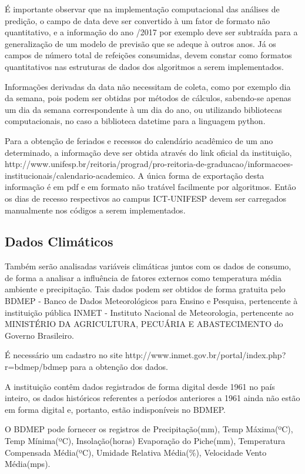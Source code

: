 \documentclass[	12pt, Times, openright, twoside, a4paper, english, brazil]{abntex2}
\begin{document}
É importante observar que na implementação computacional das análises de predição, o campo de data deve ser convertido à um fator de formato não quantitativo, e a informação do ano /2017 por exemplo deve ser subtraída para a generalização de um modelo de previsão que se adeque à outros anos. Já os campos de número total de refeições consumidas, devem constar como formatos quantitativos nas estruturas de dados dos algoritmos a serem implementados.

Informações derivadas da data não necessitam de coleta, como por exemplo dia da semana, pois podem ser obtidas por métodos de cálculos, sabendo-se apenas um dia da semana correspondente à um dia do ano, ou utilizando bibliotecas computacionais, no caso a biblioteca datetime para a linguagem python.

Para a obtenção de feriados e recessos do calendário acadêmico de um ano determinado, a informação deve ser obtida através do link oficial da instituição, http://www.unifesp.br/reitoria/prograd/pro-reitoria-de-graduacao/informacoes-institucionais/calendario-academico. A única forma de exportação desta informação é em pdf e em formato não tratável facilmente por algoritmos. Então os dias de recesso respectivos ao campus ICT-UNIFESP devem ser carregados manualmente nos códigos a serem implementados.

\subsection{Dados Climáticos}
Também serão analisadas variáveis climáticas juntos com os dados de consumo, de forma a analisar a influência de fatores externos como temperatura média ambiente e precipitação. Tais dados podem ser obtidos de forma gratuita pelo BDMEP - Banco de Dados Meteorológicos para Ensino e Pesquisa, pertencente à instituição pública INMET - Instituto Nacional de Meteorologia, pertencente ao MINISTÉRIO DA AGRICULTURA, PECUÁRIA E ABASTECIMENTO do Governo Brasileiro. 

É necessário um cadastro no site http://www.inmet.gov.br/portal/index.php?r=bdmep/bdmep para a obtenção dos dados. 

A instituição contêm dados registrados de forma digital desde 1961 no país inteiro, os dados históricos referentes a períodos anteriores a 1961 ainda não estão em forma digital e, portanto, estão indisponíveis no BDMEP.

O BDMEP pode fornecer os registros de Precipitação(mm), Temp Máxima(ºC), Temp Mínima(ºC), Insolação(horas)
Evaporação do Piche(mm), Temperatura Compensada Média(ºC), Umidade Relativa Média(\%), Velocidade Vento Média(mps).
\end{document}
